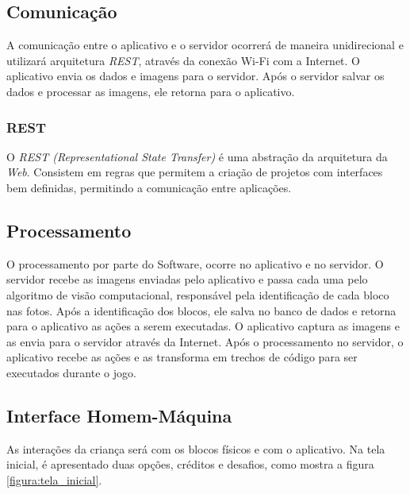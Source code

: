     \subsection{Comunicação}
    A comunicação entre o aplicativo e o servidor ocorrerá de maneira unidirecional e utilizará arquitetura \textit{REST}, através da conexão Wi-Fi com a Internet.
    O aplicativo envia os dados e imagens para o servidor. Após o servidor salvar os dados e processar as imagens, ele retorna para o aplicativo.
    
        \subsubsection{REST}
        O \textit{REST (Representational State Transfer)} é uma abstração da arquitetura da \textit{Web}. Consistem em regras que permitem a criação de projetos com interfaces bem definidas, permitindo a comunicação entre aplicações.
    
    
    \subsection{Processamento}
    O processamento por parte do Software, ocorre no aplicativo e no servidor.
    O servidor recebe as imagens enviadas pelo aplicativo e passa cada uma pelo algoritmo de visão computacional, responsável pela identificação de cada bloco nas fotos. Após a identificação dos blocos, ele salva no banco de dados e retorna para o aplicativo as ações a serem executadas.
    O aplicativo captura as imagens e as envia para o servidor através da Internet. Após o processamento no servidor, o aplicativo recebe as ações e as transforma em trechos de código para ser executados durante o jogo.
    
    \subsection{Interface Homem-Máquina}
    As interações da criança será com os blocos físicos e com o aplicativo.
    Na tela inicial, é apresentado duas opções, créditos e desafios, como mostra a figura \ref{figura:tela_inicial}.
    
